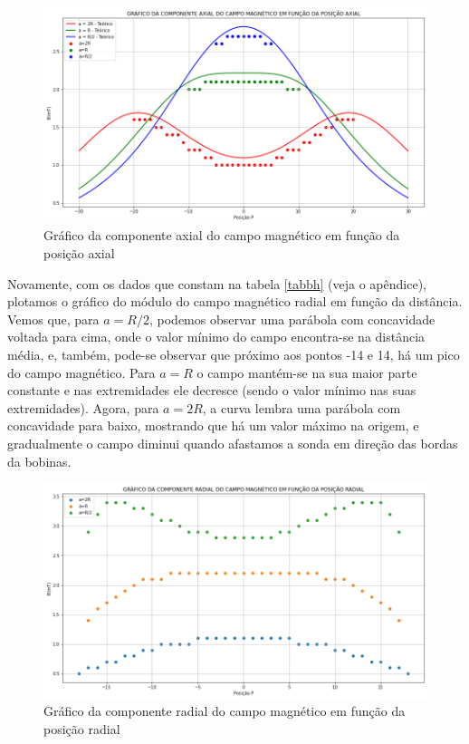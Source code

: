 \documentclass{article}
\begin{document}
\begin{figure}[H]
    \centering
    \includegraphics[width=18cm]{Imagens/ga.png}
    \caption{Gráfico da componente axial do campo magnético em função da posição axial}
    \label{grafbza}
\end{figure}

Novamente, com os dados que constam na tabela \ref{tabbh} (veja o apêndice), plotamos o gráfico do módulo do campo magnético radial em função da distância. Vemos que, para $a=R/2$, podemos observar uma parábola com concavidade voltada para cima, onde o valor mínimo do campo encontra-se na distância média, e, também, pode-se observar que próximo aos pontos -14 e 14, há um pico do campo magnético. Para $a=R$ o campo mantém-se na sua maior parte constante e nas extremidades ele decresce (sendo o valor mínimo nas suas extremidades). Agora, para $a=2R$, a curva lembra uma parábola com concavidade para baixo, mostrando que há um valor máximo na origem, e gradualmente o campo diminui quando afastamos a sonda em direção das bordas da bobinas.


\begin{figure}[H]
    \centering
    \includegraphics[width=18cm]{Imagens/gr.png}
    \caption{Gráfico da componente radial do campo magnético em função da posição radial}
    \label{grafbzr}
\end{figure}
\end{document}
